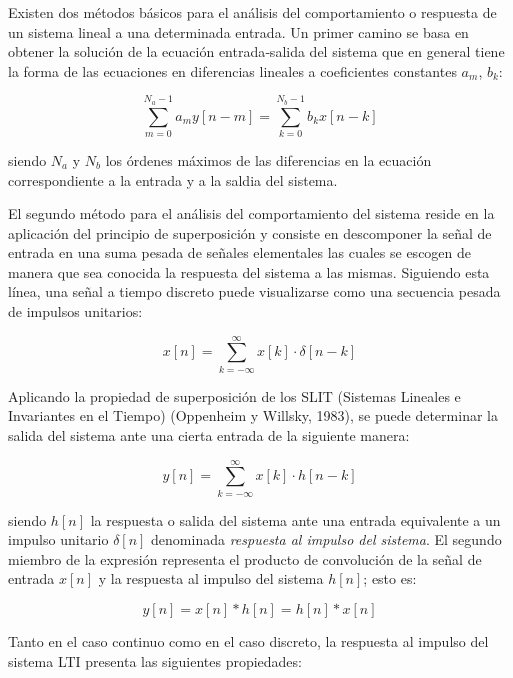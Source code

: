 \documentclass[conference]{IEEEtran}
\begin{document}
Existen dos métodos básicos para el análisis del comportamiento o respuesta de un sistema lineal a una determinada entrada. Un primer camino se basa en obtener la solución de la ecuación entrada‐salida del sistema que en general tiene la forma de las ecuaciones en diferencias lineales a coeficientes constantes \(a_{m}\), \(b_k\):

\begin{equation}
    \sum_{m=0}^{N_a - 1}{a_m y[n-m]} = \sum_{k=0}^{N_b - 1}{b_k x[n-k]}
    \label{eq:defFiltro}
\end{equation}

siendo \(N_a\) y \(N_b\) los órdenes máximos de las diferencias en la ecuación correspondiente a la entrada y a la saldia del sistema.

El segundo método para el análisis del comportamiento del sistema reside en la aplicación del principio de superposición y consiste en descomponer la señal de entrada en una suma pesada de señales elementales las cuales se escogen de manera que sea conocida la respuesta del sistema a las mismas. Siguiendo esta línea, una señal a tiempo discreto puede visualizarse como una secuencia pesada de impulsos unitarios:

\begin{equation}
    x[n] = \sum_{k=-\infty}^{\infty}{x[k] \cdot \delta [n - k] }
\end{equation}

Aplicando la propiedad de superposición de los SLIT (Sistemas Lineales e Invariantes en el Tiempo) (Oppenheim y Willsky, 1983), se puede determinar la salida del sistema ante una cierta entrada de la siguiente manera:

\begin{equation}
    y[n] = \sum_{k=-\infty}^{\infty}{x[k] \cdot h[n-k]}
\end{equation}

siendo \(h[n]\) la respuesta o salida del sistema ante una entrada equivalente a un impulso unitario \(\delta [n]\) denominada \emph{respuesta al impulso del sistema}. El segundo miembro de la expresión representa el producto de convolución de la señal de entrada \(x[n]\) y la respuesta al impulso del sistema \(h[n]\); esto es:

\begin{equation}
    y[n] = x[n] * h[n] = h[n] * x[n]
\end{equation}

Tanto en el caso continuo como en el caso discreto, la respuesta al impulso del sistema LTI presenta las siguientes propiedades:
\end{document}
